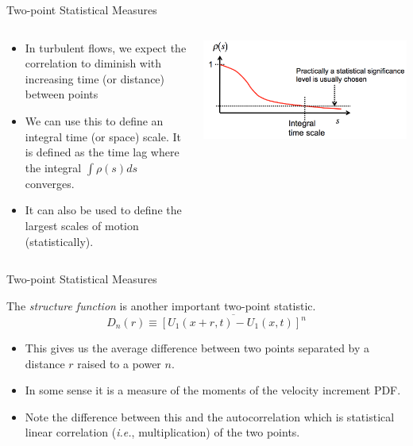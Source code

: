 \begin{frame}{Two-point Statistical Measures}
  
\setlength{\fboxsep}{0pt}
\setlength{\fboxrule}{1pt}
\begin{columns}[T]
    \begin{column}{.45\textwidth}
    \begin{itemize}
    	\item In turbulent flows, we expect the correlation to diminish with increasing time (or
distance) between points
    	\item We can use this to define an integral time (or space) scale. It is defined as the time lag where the integral $\int \rho(s)ds$ converges. 
    	\item It can also be used to define the largest scales of motion (statistically).
    \end{itemize}
    \end{column}
    \begin{column}{.55\textwidth}
    \begin{minipage}[c][.6\textheight][c]{\linewidth}
      \includegraphics[width=\textwidth]{auto1.png}
      \end{minipage}
    \end{column}
  \end{columns}
  
\end{frame}


\begin{frame}{Two-point Statistical Measures}
  
  The \textit{structure function} is another important two-point statistic.
  $$D_n(r) \equiv \overline{[U_1(x+r,t) - U_1(x,t)]^n}$$
  \begin{itemize}
  	\item This gives us the average difference between two points separated by a distance $r$ raised to a power $n$.
  	\item In some sense it is a measure of the moments of the velocity increment PDF.
  	\item Note the difference between this and the autocorrelation which is statistical linear correlation (\textit{i.e.}, multiplication) of the two points.
  \end{itemize}
  
\end{frame}


